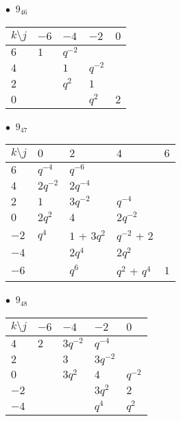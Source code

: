 %
\begin{minipage}{\linewidth}
$\bullet\ $ $9_{46}$ \vspace{0.5em} \\
\begin{tabular}{l|llll}
$k \setminus j$ & $-6$ & $-4$ & $-2$ & $0$ \\
\hline
$6$ & $1$ & $q^{-2}$ &  &  \\
$4$ &  & $1$ & $q^{-2}$ &  \\
$2$ &  & $q^{2}$ & $1$ &  \\
$0$ &  &  & $q^{2}$ & $2$ \\
\end{tabular}
\vspace{2em}
\end{minipage}
%
\begin{minipage}{\linewidth}
$\bullet\ $ $9_{47}$ \vspace{0.5em} \\
\begin{tabular}{l|llll}
$k \setminus j$ & $0$ & $2$ & $4$ & $6$ \\
\hline
$6$ & $q^{-4}$ & $q^{-6}$ &  &  \\
$4$ & $2q^{-2}$ & $2q^{-4}$ &  &  \\
$2$ & $1$ & $3q^{-2}$ & $q^{-4}$ &  \\
$0$ & $2q^{2}$ & $4$ & $2q^{-2}$ &  \\
$-2$ & $q^{4}$ & $1$ + $3q^{2}$ & $q^{-2}$ + $2$ &  \\
$-4$ &  & $2q^{4}$ & $2q^{2}$ &  \\
$-6$ &  & $q^{6}$ & $q^{2}$ + $q^{4}$ & $1$ \\
\end{tabular}
\vspace{2em}
\end{minipage}
%
\begin{minipage}{\linewidth}
$\bullet\ $ $9_{48}$ \vspace{0.5em} \\
\begin{tabular}{l|llll}
$k \setminus j$ & $-6$ & $-4$ & $-2$ & $0$ \\
\hline
$4$ & $2$ & $3q^{-2}$ & $q^{-4}$ &  \\
$2$ &  & $3$ & $3q^{-2}$ &  \\
$0$ &  & $3q^{2}$ & $4$ & $q^{-2}$ \\
$-2$ &  &  & $3q^{2}$ & $2$ \\
$-4$ &  &  & $q^{4}$ & $q^{2}$ \\
\end{tabular}
\vspace{2em}
\end{minipage}
